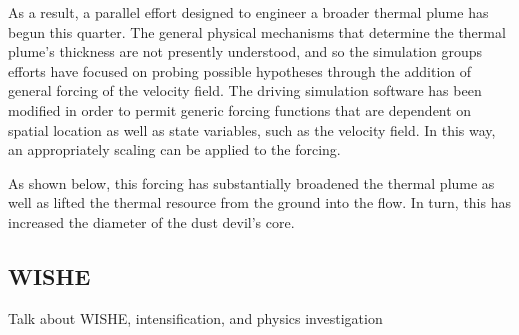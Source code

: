 As a result, a parallel effort designed to engineer a broader thermal plume has begun this 
quarter. The general physical mechanisms that determine the thermal plume's thickness are not 
presently understood, and so the simulation groups efforts have focused on probing possible 
hypotheses through the addition of general forcing of the velocity field. The driving simulation 
software has been modified in order to permit generic forcing functions that are dependent on 
spatial location as well as state variables, such as the velocity field. In this way, an appropriately 
scaling can be applied to the forcing. 

As shown below, this forcing has substantially broadened the thermal plume as well as lifted 
the thermal resource from the ground into the flow. In turn, this has increased the diameter of the 
dust devil's core.


%
%

\subsection{WISHE}

Talk about WISHE, intensification, and physics investigation
